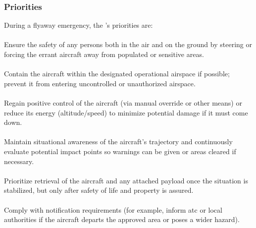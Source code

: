             \subsubsection{Priorities} During a flyaway emergency, the 's priorities are:
            
                \paragraph{}Ensure the safety of any persons both in the air and on the ground by steering or forcing the errant aircraft away from populated or sensitive areas.
                
                \paragraph{}Contain the aircraft within the designated operational airspace if possible; prevent it from entering uncontrolled or unauthorized airspace.
                
                \paragraph{}Regain positive control of the aircraft (via manual override or other means) or reduce its energy (altitude/speed) to minimize potential damage if it must come down.
                
                \paragraph{}Maintain situational awareness of the aircraft’s trajectory and continuously evaluate potential impact points so warnings can be given or areas cleared if necessary.
                
                \paragraph{}Prioritize retrieval of the aircraft and any attached payload once the situation is stabilized, but only after safety of life and property is assured.
                
                \paragraph{}Comply with notification requirements (for example, inform \ac{atc} or local authorities if the aircraft departs the approved area or poses a wider hazard).
 
